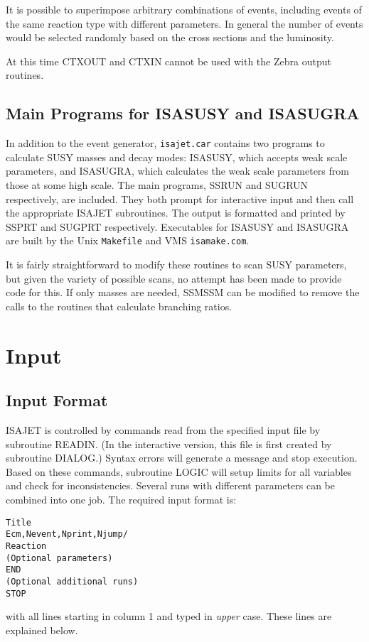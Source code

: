 It is possible to superimpose arbitrary combinations of events,
including events of the same reaction type with different parameters.
In general the number of events would be selected randomly based on the
cross sections and the luminosity.

      At this time CTXOUT and CTXIN cannot be used with the Zebra
output routines.

\subsection{Main Programs for ISASUSY and ISASUGRA\label{sugrun}}

     In addition to the event generator, \verb|isajet.car| contains two
programs to calculate SUSY masses and decay modes: ISASUSY, which
accepts weak scale parameters, and ISASUGRA, which calculates the weak
scale parameters from those at some high scale. The main programs, SSRUN
and SUGRUN respectively, are included. They both prompt for interactive
input and then call the appropriate ISAJET subroutines. The output is
formatted and printed by SSPRT and SUGPRT respectively. Executables for
ISASUSY and ISASUGRA are built by the Unix \verb|Makefile| and VMS
\verb|isamake.com|. 

     It is fairly straightforward to modify these routines to scan SUSY
parameters, but given the variety of possible scans, no attempt has been
made to provide code for this. If only masses are needed, SSMSSM can be
modified to remove the calls to the routines that calculate branching
ratios.
\newpage
\section{Input\label{INPUT}}

\subsection{Input Format}

      ISAJET is controlled by commands read from the specified input
file by subroutine READIN. (In the interactive version, this file is
first created by subroutine DIALOG.) Syntax errors will generate a
message and stop execution. Based on these commands, subroutine LOGIC
will setup limits for all variables and check for inconsistencies.
Several runs with different parameters can be combined into one job.
The required input format is:
\begin{verbatim}
Title
Ecm,Nevent,Nprint,Njump/
Reaction
(Optional parameters)
END
(Optional additional runs)
STOP
\end{verbatim}
with all lines starting in column 1 and typed in {\it upper} case. These
lines are explained below.

